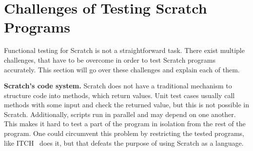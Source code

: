 %
%

\section{Challenges of Testing Scratch Programs}
\label{sec:challenges_of_testing_scratch_programs}

Functional testing for Scratch is not a straightforward task.
There exist multiple challenges, that have to be overcome in order to test Scratch programs accurately.
This section will go over these challenges and explain each of them.
\parspace

\textbf{Scratch's code system.}
Scratch does not have a traditional mechanism to structure code into methods, which return values.
Unit test cases usually call methods with some input and check the returned value, but this is not possible in Scratch.
Additionally, scripts run in parallel and may depend on one another.
This makes it hard to test a part of the program in isolation from the rest of the program.
One could circumvent this problem by restricting the tested programs, like ITCH~\cite{itch} does it,
but that defeats the purpose of using Scratch as a language.
\parspace

